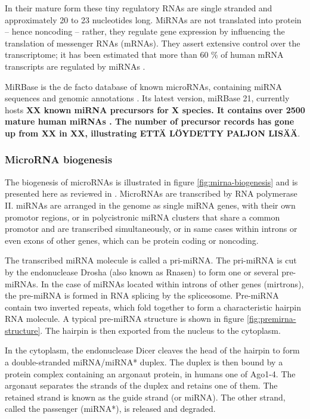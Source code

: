 In their mature form these tiny regulatory RNAs are single stranded and
approximately 20 to 23 nucleotides long. MiRNAs are not translated into protein
-- hence noncoding -- rather, they regulate gene expression by influencing the
translation of messenger RNAs (mRNAs). They assert extensive control over the
transcriptome; it has been estimated that more than 60 \% of human mRNA
transcripts are regulated by miRNAs
\cite{CITE}.

MiRBase is the de facto database of known microRNAs, containing miRNA sequences
and genomic annotations \cite{CITE}. Its latest version, miRBase 21, currently
hosts \textbf{XX known miRNA precursors for X species. It contains over 2500
mature human miRNAs \cite{CITE}. The number of precursor records has gone up
from XX in XX, illustrating ETTÄ LÖYDETTY PALJON LISÄÄ}.


\subsubsection{MicroRNA biogenesis}\label{microrna-biogenesis}

The biogenesis of microRNAs is illustrated in figure
\ref{fig:mirna-biogenesis} and is presented here as reviewed in
\cite{CITE}. MicroRNAs are transcribed by RNA polymerase II. miRNAs are
arranged in the genome as single miRNA genes, with their own promotor
regions, or in polycistronic miRNA clusters that share a common promotor
and are transcribed simultaneously, or in same cases within introns or
even exons of other genes, which can be protein coding or noncoding.

The transcribed miRNA molecule is called a pri-miRNA. The pri-miRNA is
cut by the endonuclease Drosha (also known as Rnasen) to form one or
several pre-miRNAs. In the case of miRNAs located within introns of
other genes (mirtrons), the pre-miRNA is formed in RNA splicing by the
spliceosome. Pre-miRNA contain two inverted repeats, which fold together
to form a characteristic hairpin RNA molecule. A typical pre-miRNA
structure is shown in figure \ref{fig:premirna-structure}. The hairpin
is then exported from the nucleus to the cytoplasm.

In the cytoplasm, the endonuclease Dicer cleaves the head of the hairpin
to form a double-stranded miRNA/miRNA* duplex. The duplex is then bound
by a protein complex containing an argonaut protein, in humans one of
Ago1-4. The argonaut separates the strands of the duplex and retains one
of them. The retained strand is known as the guide strand (or miRNA).
The other strand, called the passenger (miRNA*), is released and
degraded.

